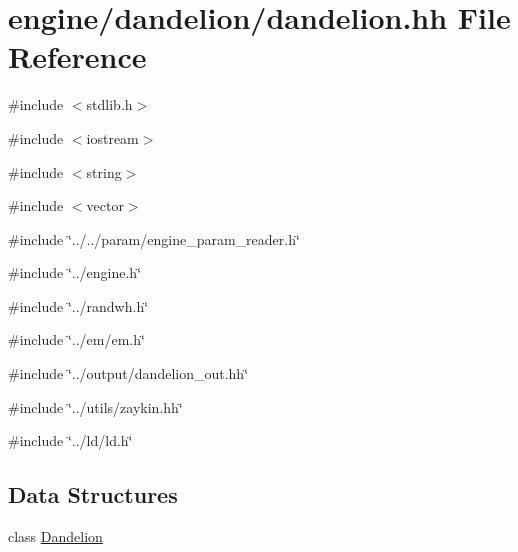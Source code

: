 \hypertarget{dandelion_8hh}{
\section{engine/dandelion/dandelion.hh File Reference}
\label{dandelion_8hh}
}
{\ttfamily \#include $<$stdlib.h$>$}\par
{\ttfamily \#include $<$iostream$>$}\par
{\ttfamily \#include $<$string$>$}\par
{\ttfamily \#include $<$vector$>$}\par
{\ttfamily \#include \char`\"{}../../param/engine\_\-param\_\-reader.h\char`\"{}}\par
{\ttfamily \#include \char`\"{}../engine.h\char`\"{}}\par
{\ttfamily \#include \char`\"{}../randwh.h\char`\"{}}\par
{\ttfamily \#include \char`\"{}../em/em.h\char`\"{}}\par
{\ttfamily \#include \char`\"{}../output/dandelion\_\-out.hh\char`\"{}}\par
{\ttfamily \#include \char`\"{}../utils/zaykin.hh\char`\"{}}\par
{\ttfamily \#include \char`\"{}../ld/ld.h\char`\"{}}\par
\subsection*{Data Structures}
\begin{DoxyCompactItemize}
\item 
class \hyperlink{classDandelion}{Dandelion}
\end{DoxyCompactItemize}
